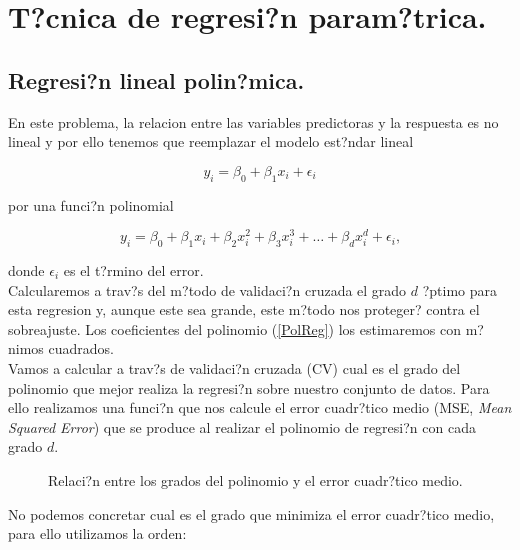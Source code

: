 \documentclass[a4paper, 12pt]{article}
\begin{document}
\section{T?cnica de regresi?n param?trica.}

\subsection{Regresi?n lineal polin?mica.}

\bigskip

En este problema, la relacion entre las variables predictoras y la respuesta es no lineal y por ello tenemos que reemplazar el modelo est?ndar lineal

\[
y_i = \beta_0 + \beta_1 x_i + \epsilon_i
\]

\medskip

por una funci?n polinomial

\begin{equation}\label{PolReg}
y_i = \beta_0 + \beta_1 x_i + \beta_2 x_i^2 + \beta_3 x_i^3 + \dots + \beta_d x_i^d + \epsilon_i\text{,}
\end{equation} 

\medskip

donde $\epsilon_i$ es el t?rmino del error. \\

Calcularemos a trav?s del m?todo de validaci?n cruzada el grado $d$ ?ptimo para 
esta regresion y, aunque este sea grande, este m?todo nos proteger? contra el 
sobreajuste. Los coeficientes del polinomio (\ref{PolReg}) los estimaremos con m?nimos cuadrados. \\


Vamos a calcular a trav?s de validaci?n cruzada (CV) cual es el grado del polinomio que mejor realiza la regresi?n sobre nuestro conjunto de datos. Para ello realizamos una funci?n que nos calcule el error cuadr?tico medio (MSE, \textit{Mean Squared Error}) que se produce al realizar el polinomio de regresi?n con cada grado $d$.


\begin{figure}[hc]\label{fig1}
\begin{center}
  \caption{Relaci?n entre los grados del polinomio y el error cuadr?tico medio.}
\end{center}
\end{figure}

No podemos concretar cual es el grado que minimiza el error cuadr?tico medio, para ello utilizamos la orden: \\
\end{document}
